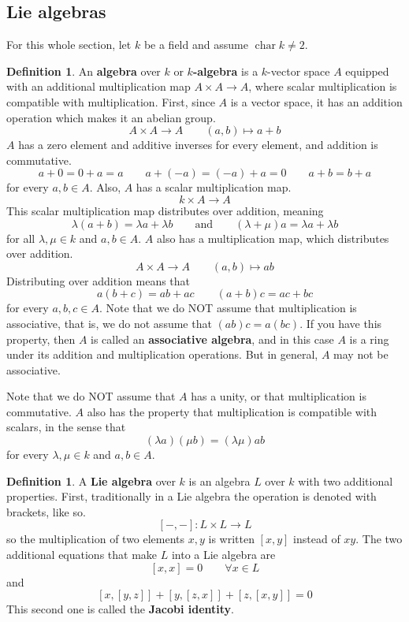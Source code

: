 \documentclass[12pt]{article}
\theoremstyle{definition}
\newtheorem{definition}[theorem]{Definition}
\newcommand{\lam}{\lambda}
\newcommand{\tbf}{\textbf}
\DeclareMathOperator{\characteristic}{char}
\begin{document}
\subsection{Lie algebras}
\label{Lie algebras}

For this whole section, let $k$ be a field and assume $\characteristic k \neq 2$.

\begin{definition}
An \tbf{algebra} over $k$ or \tbf{$k$-algebra} is a $k$-vector space $A$ equipped with an additional multiplication map $A \times A \to A$, where scalar multiplication is compatible with multiplication. First, since $A$ is a vector space, it has an addition operation which makes it an abelian group. 
	\[
		A \times A \to A \qquad (a,b) \mapsto a+b
	\]
	$A$ has a zero element and additive inverses for every element, and addition is commutative.
	\[
		a + 0 = 0 + a = a \qquad a + (-a) = (-a) + a = 0 \qquad a+b = b+a
	\]
for every $a,b \in A$. Also, $A$ has a scalar multiplication map.
	\[
		k \times A \to A
	\]
	This scalar multiplication map distributes over addition, meaning
	\[
		\lam(a+b) = \lam a + \lam b \qquad \text{and} \qquad (\lam + \mu)a = \lam a + \lam b
	\]
for all $\lam, \mu \in k$ and $a,b \in A$. $A$ also has a multiplication map, which distributes over addition.
	\[
		A \times A \to A \qquad (a,b) \mapsto ab
	\]
	Distributing over addition means that
	\[
		a(b+c) = ab + ac \qquad (a+b)c = ac + bc
	\]
for every $a,b,c \in A$. Note that we do NOT assume that multiplication is associative, that is, we do not assume that $(ab)c = a(bc)$. If you have this property, then $A$ is called an \tbf{associative algebra}, and in this case $A$ is a ring under its addition and multiplication operations. But in general, $A$ may not be associative.

Note that we do NOT assume that $A$ has a unity, or that multiplication is commutative. $A$ also has the property that multiplication is compatible with scalars, in the sense that
	\[
		(\lam a)(\mu b) = (\lam \mu) ab
	\]
	for every $\lam, \mu \in k$ and $a,b \in A$.
\end{definition}

\begin{definition}
A \tbf{Lie algebra} over $k$ is an algebra $L$ over $k$ with two additional properties. First, traditionally in a Lie algebra the operation is denoted with brackets, like so.
\[
	[-,-]:L \times L \to L
\]
so the multiplication of two elements $x,y$ is written $[x,y]$ instead of $xy$. The two additional equations that make $L$ into a Lie algebra are
\[
	[x,x] = 0 \qquad \forall x \in L
\]
and
\[
	[x,[y,z]] + [y,[z,x]] + [z,[x,y]] = 0
\]
This second one is called the \tbf{Jacobi identity}.
\end{definition}
\end{document}
